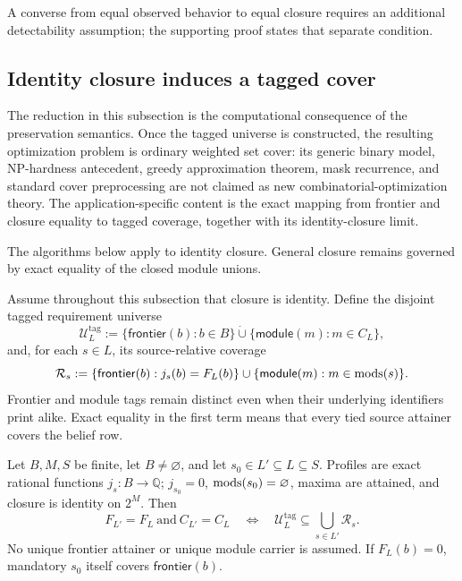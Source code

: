 A converse from equal observed behavior to equal closure requires an additional detectability assumption; the supporting proof states that separate condition.

\subsection{Identity closure induces a tagged cover}
\label{subsec:aor-tagged-cover}

The reduction in this subsection is the computational consequence of the
preservation semantics. Once the tagged universe is constructed, the resulting
optimization problem is ordinary weighted set cover: its generic binary model,
NP-hardness antecedent, greedy approximation theorem, mask recurrence, and
standard cover preprocessing are not claimed as new combinatorial-optimization
theory. The application-specific content is the exact mapping from frontier and
closure equality to tagged coverage, together with its identity-closure limit.

The algorithms below apply to identity closure. General closure remains governed by exact equality of the closed module unions.


Assume throughout this subsection that closure is identity.  Define the
disjoint tagged requirement universe
\begin{equation}
 \mathcal U_L^{\mathrm{tag}}
 :=\{\mathsf{frontier}(b):b\in B\}
   \mathbin{\dot\cup}
   \{\mathsf{module}(m):m\in C_L\},
 \label{eq:tagged-requirement-universe}
\end{equation}
and, for each \(s\in L\), its source-relative coverage
\begin{equation}
 \mathcal R_s
 :=\{\mathsf{frontier}(b):j_s(b)=F_L(b)\}
   \cup
   \{\mathsf{module}(m):m\in\operatorname{mods}(s)\}.
 \label{eq:strategy-tagged-coverage}
\end{equation}
Frontier and module tags remain distinct even when their underlying identifiers
print alike.  Exact equality in the first term means that every tied source
attainer covers the belief row.

\begin{theorem}
\label{thm:aor-tagged-cover-equivalence}
Let \(B,M,S\) be finite, let \(B\neq\varnothing\), and let
\(s_0\in L'\subseteq L\subseteq S\).  Profiles are exact rational functions
\(j_s:B\to\mathbb Q\); \(j_{s_0}=0\), \(\operatorname{mods}(s_0)=\varnothing\), maxima are
attained, and closure is identity on \(2^M\).  Then
\begin{equation}
 F_{L'}=F_L\ \text{and}\ C_{L'}=C_L
 \quad\Longleftrightarrow\quad
 \mathcal U_L^{\mathrm{tag}}\subseteq
       \bigcup_{s\in L'}\mathcal R_s.
 \label{eq:tagged-cover-equivalence}
\end{equation}
No unique frontier attainer or unique module carrier is assumed.  If
\(F_L(b)=0\), mandatory \(s_0\) itself covers
\(\mathsf{frontier}(b)\).
\end{theorem}

